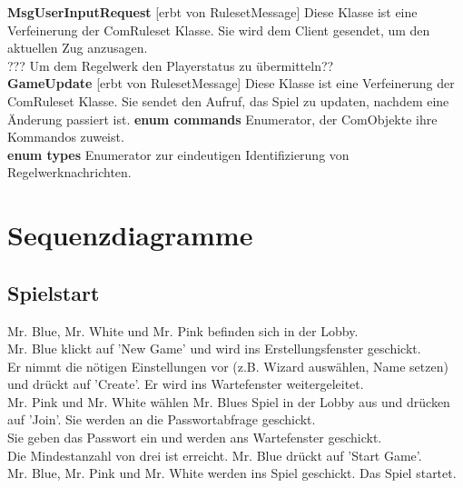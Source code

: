 \documentclass{article}
\begin{document}
		\textbf{MsgUserInputRequest} [erbt von RulesetMessage] Diese Klasse ist eine Verfeinerung der ComRuleset Klasse. Sie wird dem Client gesendet, um den aktuellen Zug anzusagen.\\ ??? Um dem Regelwerk den Playerstatus zu übermitteln?? \\
		\textbf{GameUpdate} [erbt von RulesetMessage] Diese Klasse ist eine Verfeinerung der ComRuleset Klasse. Sie sendet den Aufruf, das Spiel zu updaten, nachdem eine Änderung passiert ist.
		\textbf{enum commands} Enumerator, der ComObjekte ihre Kommandos zuweist. \\
		\textbf{enum types} Enumerator zur eindeutigen Identifizierung von Regelwerknachrichten.
\ \\

\section{Sequenzdiagramme}
	\subsection{Spielstart}
		Mr. Blue, Mr. White und Mr. Pink befinden sich in der Lobby. \\
		Mr. Blue klickt auf 'New Game' und wird ins Erstellungsfenster geschickt. \\
		Er nimmt die nötigen Einstellungen vor (z.B. Wizard auswählen, Name setzen) und drückt auf 'Create'. Er wird ins Wartefenster weitergeleitet.\\
		Mr. Pink und Mr. White wählen Mr. Blues Spiel in der Lobby aus und drücken auf 'Join'. Sie werden an die Passwortabfrage geschickt.\\
		Sie geben das Passwort ein und werden ans Wartefenster geschickt.\\
		Die Mindestanzahl von drei ist erreicht. Mr. Blue drückt auf 'Start Game'.\\
		Mr. Blue, Mr. Pink und Mr. White werden ins Spiel geschickt. Das Spiel startet.\\
\end{document}
